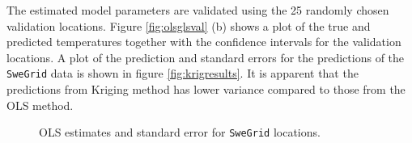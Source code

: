 \documentclass[a4paper,10pt]{article}
\begin{document}
The estimated model parameters are validated using the 25 randomly chosen validation locations. Figure \ref{fig:olsglsval} (b) shows a plot of the true and predicted temperatures together with the confidence intervals for the validation locations. A plot of the prediction and standard errors for the predictions of the {\texttt{SweGrid}} data is shown in figure \ref{fig:krigresults}. It is apparent that the predictions from Kriging method has lower variance compared to those from the OLS method.
\pagebreak
\begin{figure}[ht]
\centering
  \qquad
  \caption{OLS estimates and standard error for \texttt{SweGrid} locations.}
\label{fig:olsresults}
\end{figure}
\end{document}
